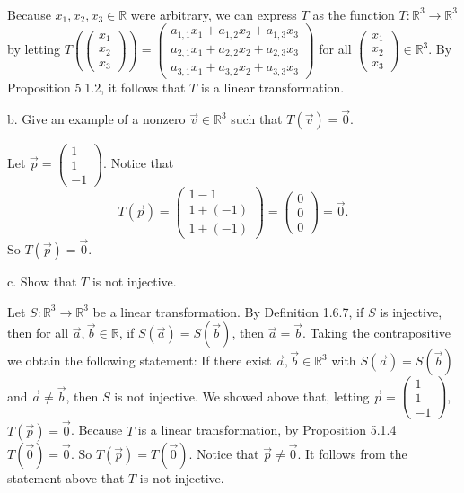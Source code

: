 \documentclass[12pt]{article}
\newenvironment{problem}[2][Problem]
{
	\begin{trivlist} 
		\item[\hskip \labelsep {\bfseries #1 #2:}]
	}
{
	\end{trivlist}
	}
\newenvironment{solution}[1][Solution]
{
	\begin{trivlist} 
		\item[\hskip \labelsep {\itshape #1:}]
	}
	{
	\end{trivlist}
}
\begin{document}
\begin{problem}{4}
\begin{solution}
\begin{align*}
\end{align*}
Because $x_1,x_2,x_3 \in \mathbb{R}$ were arbitrary, we can express $T$ as the function $T:\mathbb{R}^3 \to \mathbb{R}^3$ by letting $T\left( \begin{pmatrix} x_1\\x_2\\x_3 \end{pmatrix} \right) = \begin{pmatrix} a_{1,1}x_1 + a_{1,2}x_2 + a_{1,3}x_3\\a_{2,1}x_1 + a_{2,2}x_2 + a_{2,3}x_3\\ a_{3,1}x_1 + a_{3,2}x_2 + a_{3,3}x_3 \end{pmatrix}$ for all $\begin{pmatrix} x_1\\x_2\\x_3 \end{pmatrix} \in \mathbb{R}^3$. By Proposition 5.1.2, it follows that $T$ is a linear transformation.
\end{solution}
\noindent
\newline
\newline
b. Give an example of a nonzero $\vec{v} \in \mathbb{R}^3$ such that $T(\vec{v})=\vec{0}$.
\begin{solution}
Let $\vec{p} = \begin{pmatrix}1\\1\\-1 \end{pmatrix}$. Notice that
\[
T(\vec{p}) = \begin{pmatrix} 1-1\\1+(-1)\\1+(-1)\end{pmatrix}= \begin{pmatrix} 0\\0\\0 \end{pmatrix}= \vec{0}.
\]
So $T(\vec{p}) = \vec{0}$.
\end{solution}
\noindent
\newline
\newline
c. Show that $T$ is not injective.
\begin{solution}
Let $S:\mathbb{R}^3 \to \mathbb{R}^3$ be a linear transformation. By Definition 1.6.7, if $S$ is injective, then for all $\vec{a},\vec{b} \in \mathbb{R}$, if $S(\vec{a}) = S(\vec{b})$, then $\vec{a} = \vec{b}$. Taking the contrapositive we obtain the following statement:
If there exist $\vec{a}, \vec{b} \in \mathbb{R}^3$ with $S(\vec{a}) = S(\vec{b})$ and $\vec{a} \neq \vec{b}$, then $S$ is not injective. We showed above that, letting $\vec{p} = \begin{pmatrix}1\\1\\-1 \end{pmatrix}$, $T(\vec{p}) = \vec{0}$. Because $T$ is a linear transformation, by Proposition 5.1.4 $T(\vec{0}) = \vec{0}$. So $T(\vec{p}) = T(\vec{0})$. Notice that $\vec{p} \neq \vec{0}$. It follows from the statement above that $T$ is not injective.
\end{solution}


\end{problem}
\end{document}
